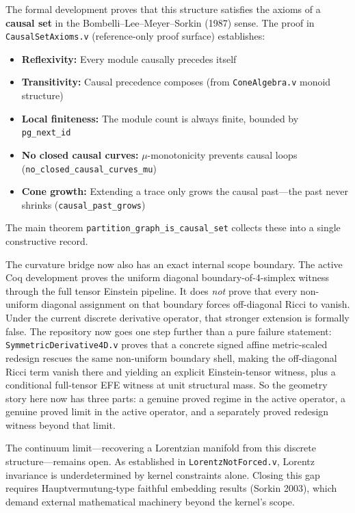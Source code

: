 The formal development proves that this structure satisfies the axioms of a \textbf{causal set} in the Bombelli--Lee--Meyer--Sorkin (1987) sense. The proof in \texttt{CausalSetAxioms.v} (reference-only proof surface) establishes:
\begin{itemize}
    \item \textbf{Reflexivity:} Every module causally precedes itself
    \item \textbf{Transitivity:} Causal precedence composes (from \texttt{ConeAlgebra.v} monoid structure)
    \item \textbf{Local finiteness:} The module count is always finite, bounded by \texttt{pg\_next\_id}
    \item \textbf{No closed causal curves:} $\mu$-monotonicity prevents causal loops (\texttt{no\_closed\_causal\_curves\_mu})
    \item \textbf{Cone growth:} Extending a trace only grows the causal past---the past never shrinks (\texttt{causal\_past\_grows})
\end{itemize}
The main theorem \texttt{partition\_graph\_is\_causal\_set} collects these into a single constructive record.

The curvature bridge now also has an exact internal scope boundary. The active Coq development proves the uniform diagonal boundary-of-4-simplex witness through the full tensor Einstein pipeline. It does \emph{not} prove that every non-uniform diagonal assignment on that boundary forces off-diagonal Ricci to vanish. Under the current discrete derivative operator, that stronger extension is formally false. The repository now goes one step further than a pure failure statement: \texttt{SymmetricDerivative4D.v} proves that a concrete signed affine metric-scaled redesign rescues the same non-uniform boundary shell, making the off-diagonal Ricci term vanish there and yielding an explicit Einstein-tensor witness, plus a conditional full-tensor EFE witness at unit structural mass. So the geometry story here now has three parts: a genuine proved regime in the active operator, a genuine proved limit in the active operator, and a separately proved redesign witness beyond that limit.

The continuum limit---recovering a Lorentzian manifold from this discrete structure---remains open. As established in \texttt{LorentzNotForced.v}, Lorentz invariance is underdetermined by kernel constraints alone. Closing this gap requires Hauptvermutung-type faithful embedding results (Sorkin 2003), which demand external mathematical machinery beyond the kernel's scope.

